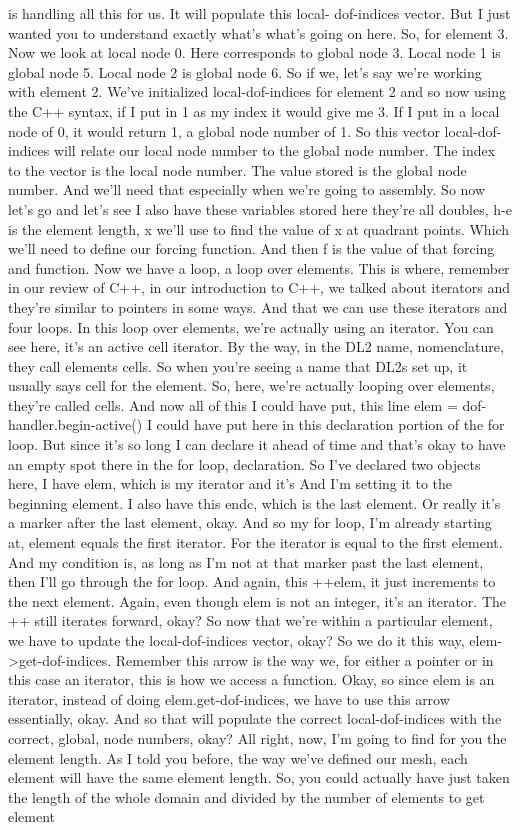 \documentclass[10pt]{article}
\begin{document}
{is handling all this for us. It will populate this local- dof-indices vector. But I just wanted you to understand exactly what's what's going on here. So, for element 3. Now we look at local node 0. Here corresponds to global node 3. Local node 1 is global node 5. Local node 2 is global node 6. So if we, let's say we're working with element 2. We've initialized local-dof-indices for element 2 and so now using the C++ syntax, if I put in 1 as my index it would give me 3. If I put in a local node of 0, it would return 1, a global node number of 1. So this vector local-dof-indices will relate our local node number to the global node number. The index to the vector is the local node number. The value stored is the global node number. And we'll need that especially when we're going to assembly. So now let's go and let's see I also have these variables stored here they're all doubles, h-e is the element length, x we'll use to find the value of x at quadrant points. Which we'll need to define our forcing function. And then f is the value of that forcing and function. Now we have a loop, a loop over elements. This is where, remember in our review of C++, in our introduction to C++, we talked about iterators and they're similar to pointers in some ways. And that we can use these iterators and four loops. In this loop over elements, we're actually using an iterator. You can see here, it's an active cell iterator. By the way, in the DL2 name, nomenclature, they call elements cells. So when you're seeing a name that DL2s set up, it usually says cell for the element. So, here, we're actually looping over elements, they're called cells. And now all of this I could have put, this line elem = dof-handler.begin-active() I could have put here in this declaration portion of the for loop. But since it's so long I can declare it ahead of time and that's okay to have an empty spot there in the for loop, declaration. So I've declared two objects here, I have elem, which is my iterator and it's And I'm setting it to the beginning element. I also have this endc, which is the last element. Or really it's a marker after the last element, okay. And so my for loop, I'm already starting at, element equals the first iterator. For the iterator is equal to the first element. And my condition is, as long as I'm not at that marker past the last element, then I'll go through the for loop. And again, this ++elem, it just increments to the next element. Again, even though elem is not an integer, it's an iterator. The ++ still iterates forward, okay? So now that we're within a particular element, we have to update the local-dof-indices vector, okay? So we do it this way, elem->get-dof-indices. Remember this arrow is the way we, for either a pointer or in this case an iterator, this is how we access a function. Okay, so since elem is an iterator, instead of doing elem.get-dof-indices, we have to use this arrow essentially, okay. And so that will populate the correct local-dof-indices with the correct, global, node numbers, okay? All right, now, I'm going to find for you the element length. As I told you before, the way we've defined our mesh, each element will have the same element length. So, you could actually have just taken the length of the whole domain and divided by the number of elements to get element }
\end{document}
